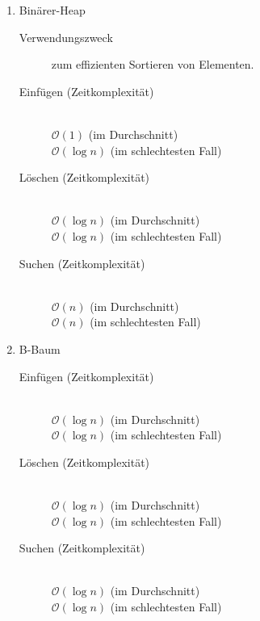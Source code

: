 \documentclass{bschlangaul-aufgabe}
\begin{document}
\begin{enumerate}

\item Binärer-Heap

\begin{bAntwort}
\begin{description}
\item[Verwendungszweck] zum effizienten Sortieren von Elementen.

\item[Einfügen (Zeitkomplexität)] \strut \\
$\mathcal{O}(1)$ (im Durchschnitt) \\
$\mathcal{O}(\log n)$ (im schlechtesten Fall)

\item[Löschen (Zeitkomplexität)] \strut \\
$\mathcal{O}(\log n)$ (im Durchschnitt) \\
$\mathcal{O}(\log n)$ (im schlechtesten Fall)

\item[Suchen (Zeitkomplexität)] \strut \\
$\mathcal{O}(n)$ (im Durchschnitt) \\
$\mathcal{O}(n)$ (im schlechtesten Fall)
\end{description}
\end{bAntwort}


\item B-Baum

\begin{bAntwort}
\begin{description}
\item[Einfügen (Zeitkomplexität)] \strut \\
$\mathcal{O}(\log n)$ (im Durchschnitt) \\
$\mathcal{O}(\log n)$ (im schlechtesten Fall)

\item[Löschen (Zeitkomplexität)] \strut \\
$\mathcal{O}(\log n)$ (im Durchschnitt) \\
$\mathcal{O}(\log n)$ (im schlechtesten Fall)

\item[Suchen (Zeitkomplexität)] \strut \\
$\mathcal{O}(\log n)$ (im Durchschnitt) \\
$\mathcal{O}(\log n)$ (im schlechtesten Fall)
\end{description}
\end{bAntwort}


\end{enumerate}
\end{document}
